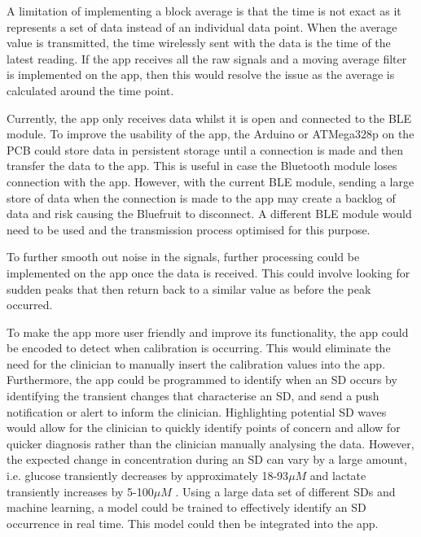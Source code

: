 A limitation of implementing a block average is that the time is not exact as it represents a set of data instead of an individual data point. When the average value is transmitted, the time wirelessly sent with the data is the time of the latest reading. If the app receives all the raw signals and a moving average filter is implemented on the app, then this would resolve the issue as the average is calculated around the time point.

Currently, the app only receives data whilst it is open and connected to the BLE module. To improve the usability of the app, the Arduino or ATMega328p on the PCB could store data in persistent storage until a connection is made and then transfer the data to the app. This is useful in case the Bluetooth module loses connection with the app. However, with the current BLE module, sending a large store of data when the connection is made to the app may create a backlog of data and risk causing the Bluefruit to disconnect. A different BLE module would need to be used and the transmission process optimised for this purpose.

To further smooth out noise in the signals, further processing could be implemented on the app once the data is received. This could involve looking for sudden peaks that then return back to a similar value as before the peak occurred. 

To make the app more user friendly and improve its functionality, the app could be encoded to detect when calibration is occurring. This would eliminate the need for the clinician to manually insert the calibration values into the app. Furthermore, the app could be programmed to identify when an SD occurs by identifying the transient changes that characterise an SD, and send a push notification or alert to inform the clinician. Highlighting potential SD waves would allow for the clinician to quickly identify points of concern and allow for quicker diagnosis rather than the clinician manually analysing the data. However, the expected change in concentration during an SD can vary by a large amount, i.e. glucose transiently decreases by approximately 18-93$\mu M$ and lactate transiently increases by 5-100$\mu M$ \cite{Rogers2017}. Using a large data set of different SDs and machine learning, a model could be trained to effectively identify an SD occurrence in real time. This model could then be integrated into the app.

